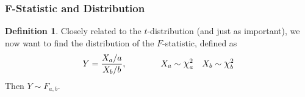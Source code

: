 \documentclass[12pt]{article}
\theoremstyle{plain}
\theoremstyle{definition}
\newtheorem{defn}[thm]{Definition}
\theoremstyle{remark}
\newcommand*{\Chi}{\mbox{\large$\chi$}} %
\begin{document}
\newpage
\subsubsection{F-Statistic and Distribution}


\begin{defn}
Closely related to the $t$-distribution (and just as important), we now
want to find the distribution of the $F$-statistic, defined as
\begin{align*}
  Y = \frac{ X_a / a}{X_b / b},\qquad\qquad
  X_a \sim \Chi^2_a
  \quad X_b \sim \Chi^2_b
\end{align*}
Then $Y\sim F_{a,b}$.
\end{defn}
\end{document}
